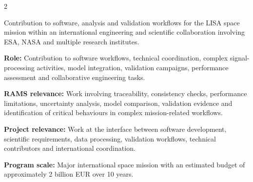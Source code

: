 \documentclass[8pt,a4paper,ragged2e,withhyper]{altacv}
\begin{document}
\begin{paracol}{2}

\divider

\divider

\medskip


\divider

\divider

\divider


\end{paracol}



Contribution to software, analysis and validation workflows for the LISA space mission within an international engineering and scientific collaboration involving ESA, NASA and multiple research institutes.

\textbf{Role:} Contribution to software workflows, technical coordination, complex signal-processing activities, model integration, validation campaigns, performance assessment and collaborative engineering tasks.

\textbf{RAMS relevance:} Work involving traceability, consistency checks, performance limitations, uncertainty analysis, model comparison, validation evidence and identification of critical behaviours in complex mission-related workflows.

\textbf{Project relevance:} Work at the interface between software development, scientific requirements, data processing, validation workflows, technical contributors and international coordination.

\textbf{Program scale:} Major international space mission with an estimated budget of approximately 2 billion EUR over 10 years.

\divider

\end{document}
